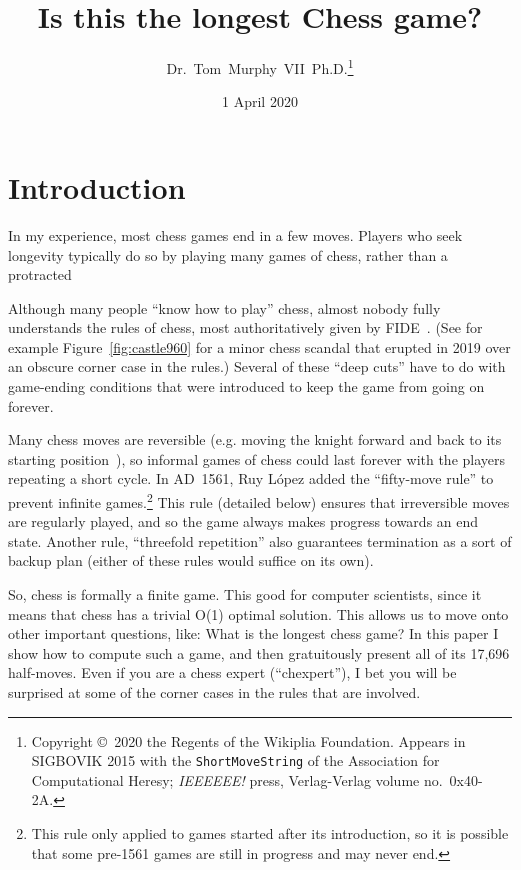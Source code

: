 \documentclass[twocolumn]{article}
\begin{document}
 

\title{Is this the longest Chess game?}
\author{Dr.~Tom~Murphy~VII~Ph.D.\thanks{
Copyright \copyright\ 2020 the Regents of the Wikiplia
Foundation. Appears in SIGBOVIK 2015 with the {\tt ShortMoveString} of the
Association for Computational Heresy; {\em IEEEEEE!} press,
Verlag-Verlag volume no.~0x40-2A.
}
}

\renewcommand\>{$>$}
\newcommand\<{$<$}

\date{1 April 2020}

\maketitle

\section{Introduction}

In my experience, most chess games end in a few moves. Players who
seek longevity typically do so by playing many games of chess, rather
than a protracted


Although many people ``know how to play'' chess, almost nobody fully
understands the rules of chess, most authoritatively given by
FIDE~\cite{fiderules}. (See for example Figure~\ref{fig:castle960} for
a minor chess scandal that erupted in 2019 over an obscure corner case
in the rules.) Several of these ``deep cuts'' have to do with game-ending
conditions that were introduced to keep the game from going on forever.

Many chess moves are reversible (e.g. moving the knight forward and
back to its starting position~\cite{survival}), so informal games of
chess could last forever with the players repeating a short cycle. In
AD~1561, Ruy L\'opez added the ``fifty-move rule'' to prevent infinite
games.\footnote{This rule only applied to games started after its
  introduction, so it is possible that some pre-1561 games are still
  in progress and may never end.} This rule (detailed below) ensures
that irreversible moves are regularly played, and so the game always
makes progress towards an end state. Another rule, ``threefold
repetition'' also guarantees termination as a sort of backup plan
(either of these rules would suffice on its own).

So, chess is formally a finite game. This good for computer
scientists, since it means that chess has a trivial O(1) optimal
solution. This allows us to move onto other important questions, like:
What is the longest chess game? In this paper I show how to compute
such a game, and then gratuitously present all of its
17,696 
%
half-moves. Even if you are a chess expert (``chexpert''), I bet you
will be surprised at some of the corner cases in the rules that are
involved.
\end{document}

